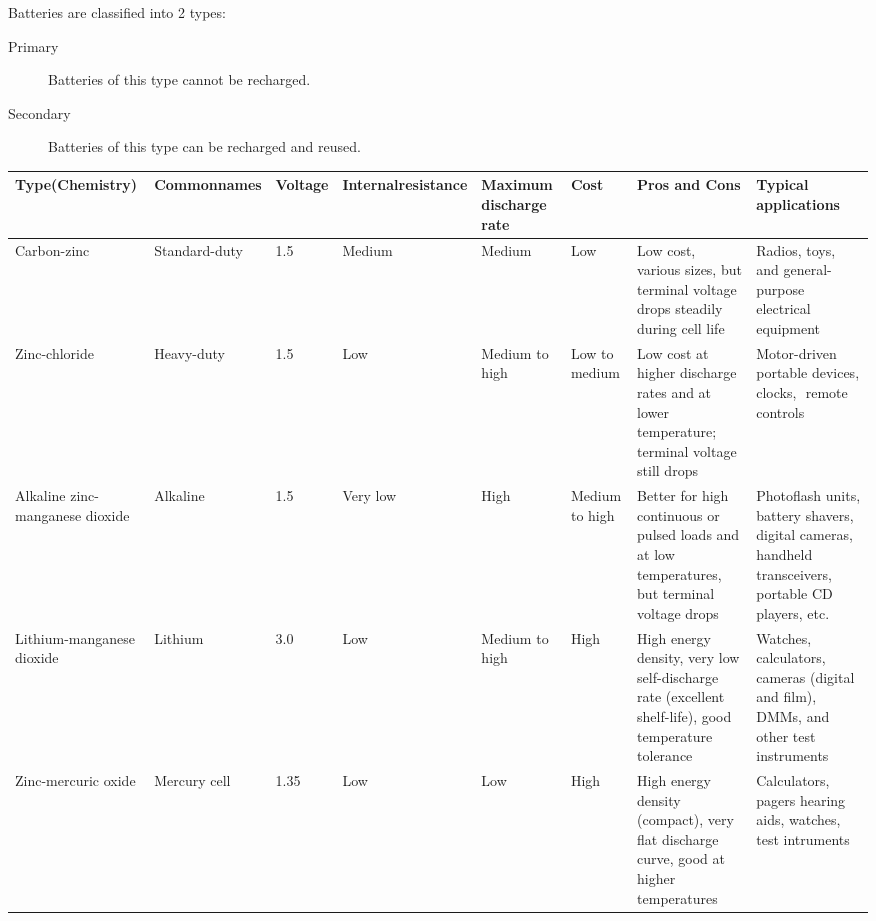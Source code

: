 \documentclass[../../document]{subfiles}
\begin{document}
Batteries are classified into 2 types:
\begin{description}
	\item[Primary] Batteries of this type cannot be recharged.
	\item[Secondary] Batteries of this type can be recharged and reused.
\end{description}

\begin{sidewaystable}
	\begin{center}
		\small
		\begin{tabular}{p{.09\textheight}p{.07\textheight}p{.06\textheight}p{.07\textheight}p{.12\textheight}p{.05\textheight}p{.22\textheight}p{.2\textheight}}
			\toprule 
			Type\newline (Chemistry)  & Common\newline names & Voltage
																& Internal\newline resistance & Maximum\newline
			discharge rate & Cost & Pros and Cons & Typical applications\\
			\midrule
			Carbon-zinc & Standard-duty & 1.5 & Medium & Medium & Low & Low cost,
			various sizes, but terminal voltage drops steadily during cell life &
			Radios, toys, and general-purpose electrical equipment\\
			\midrule
			Zinc-chloride & Heavy-duty & 1.5 & Low & Medium to high & Low to medium &
			Low cost at higher discharge rates and at lower temperature; terminal
			voltage still drops & Motor-driven  portable devices, clocks, ­ remote
			controls\\
			\midrule
			Alkaline zinc-manganese dioxide & Alkaline & 1.5 & Very low & High &
			Medium to high & Better for high continuous or pulsed loads and at low
			temperatures, but terminal voltage drops & Photoflash units, battery
			shavers, digital cameras, handheld transceivers, portable CD players,
			etc.\\
			\midrule
			Lithium-manganese dioxide & Lithium & 3.0 & Low & Medium to high & High &
			High energy density, very low self-discharge rate (excellent shelf-life),
			good temperature tolerance & Watches, calculators, cameras (digital and
			film), DMMs, and other test instruments\\
			\midrule
			Zinc-mercuric oxide & Mercury cell & 1.35 & Low & Low & High & High
			energy density (compact), very flat discharge curve, good at higher
			temperatures & Calculators, pagers hearing aids, watches, test intruments\\

\end{tabular}
\end{center}
\end{sidewaystable}
\end{document}
